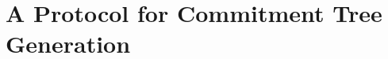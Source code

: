 \chapter{A Protocol for Commitment Tree Generation} %
\label{cha:A Protocol for Commitment Tree Generation}

